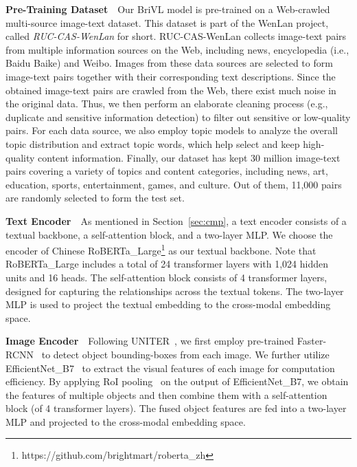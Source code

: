 \documentclass[10pt,twocolumn,letterpaper]{article}
\begin{document}
\noindent\textbf{Pre-Training Dataset}~~Our BriVL model is pre-trained on a Web-crawled multi-source image-text dataset. This dataset is part of the WenLan project, called \emph{RUC-CAS-WenLan} for short. RUC-CAS-WenLan collects image-text pairs from multiple information sources on the Web, including news, encyclopedia (i.e., Baidu Baike) and Weibo. Images from these data sources are selected to form image-text pairs together with their corresponding text descriptions. Since the obtained image-text pairs are crawled from the Web, there exist much noise in the original data. Thus, we then perform an elaborate cleaning process (e.g., duplicate and sensitive information detection) to filter out sensitive or low-quality pairs. For each data source, we also employ topic models to analyze the overall topic distribution and extract topic words, which help select and keep high-quality content information.
Finally, our dataset has kept 30 million image-text pairs covering a variety of topics and content categories, including news, art, education, sports, entertainment, games, and culture. Out of them, 11,000 pairs are randomly selected to form the test set.

\noindent\textbf{Text Encoder}~~As mentioned in Section~\ref{sec:cmp}, a text encoder consists of a textual backbone, a self-attention block, and a two-layer MLP. We choose the encoder of Chinese RoBERTa\_Large\footnote{https://github.com/brightmart/roberta\_zh} as our textual backbone. Note that RoBERTa\_Large includes a total of 24 transformer layers with 1,024 hidden units and 16 heads. The self-attention block consists of 4 transformer layers, designed for capturing the relationships across the textual tokens. The two-layer MLP is used to project the textual embedding to the cross-modal embedding space.

\noindent\textbf{Image Encoder}~~Following UNITER~\cite{chen2020uniter}, we first employ pre-trained Faster-RCNN~\cite{ren2016faster} to detect object bounding-boxes from each image. We further utilize EfficientNet\_B7~\cite{tan2019efficientnet} to extract the visual features of each image for computation efficiency. By applying RoI pooling~\cite{girshick2015fast} on the output of EfficientNet\_B7, we obtain the features of multiple objects and then combine them with a self-attention block (of 4 transformer layers). The fused object features are fed into a two-layer MLP and projected to the cross-modal embedding space.
\end{document}
